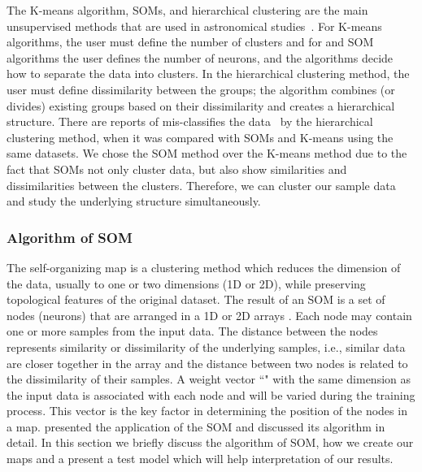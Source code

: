 The K-means algorithm, SOMs, and hierarchical clustering are the main unsupervised methods that are used in astronomical studies~\citep[e.g.][]{DAbrusco12, Aycha16}.
For K-means algorithms, the user must define the number of clusters and for and SOM algorithms the user defines the number of neurons, and the algorithms decide how to separate the data into clusters.
In the hierarchical clustering method, the user must define dissimilarity between the groups; the algorithm combines (or divides) existing groups based on their dissimilarity and creates a hierarchical structure. 
There are reports of mis-classifies the data~\citep[][and references therein]{Mangiameli96} by the hierarchical clustering method, when it was compared with SOMs and K-means using the same datasets.
We chose the SOM method over the K-means method due to the fact that SOMs not only cluster data, but also show similarities and dissimilarities between the clusters.
Therefore, we can cluster our sample data and study the underlying structure simultaneously.




     
    \subsubsection{Algorithm of SOM} 
   \label{sec: algorithm_somz}
    The self-organizing map is a clustering method which reduces the dimension of the data, usually to one or two dimensions (1D or 2D), while preserving topological features of the original dataset.
    The result of an SOM is a set of nodes (neurons) that are arranged in a 1D or 2D arrays \citep{Kohonen98}. 
    Each node may contain one or more samples from the input data.
    The distance between the nodes represents similarity or dissimilarity of the underlying samples, i.e., similar data are closer together in the array and the distance between two nodes is related to the dissimilarity of their samples.
    A weight vector ``" with the same dimension as the input data is associated with each node and will be varied during the training process.
    This vector is the key factor in determining the position of the nodes in a map.
    \cite{Geach12} presented the application of the SOM and discussed its algorithm in detail.
    In this section we briefly discuss the algorithm of SOM, how we create our maps and a present a test model which will help interpretation of our results. 
   
